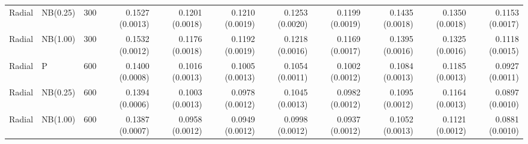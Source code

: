 \begin{table}[p]
{\begin{tabular}{lllrrrrrrrr}
Radial & NB(0.25) & 300 & 0.1527 (0.0013) & 0.1201 (0.0018) & 0.1210 (0.0019) & 0.1253 (0.0020) & 0.1199 (0.0019) & 0.1435 (0.0018) & 0.1350 (0.0018) & 0.1153 (0.0017) \\
Radial & NB(1.00) & 300 & 0.1532 (0.0012) & 0.1176 (0.0018) & 0.1192 (0.0019) & 0.1218 (0.0016) & 0.1169 (0.0017) & 0.1395 (0.0016) & 0.1325 (0.0016) & 0.1118 (0.0015) \\
Radial & P & 600 & 0.1400 (0.0008) & 0.1016 (0.0013) & 0.1005 (0.0013) & 0.1054 (0.0011) & 0.1002 (0.0012) & 0.1084 (0.0013) & 0.1185 (0.0013) & 0.0927 (0.0011) \\
Radial & NB(0.25) & 600 & 0.1394 (0.0006) & 0.1003 (0.0013) & 0.0978 (0.0012) & 0.1045 (0.0013) & 0.0982 (0.0012) & 0.1095 (0.0012) & 0.1164 (0.0013) & 0.0897 (0.0010) \\
Radial & NB(1.00) & 600 & 0.1387 (0.0007) & 0.0958 (0.0012) & 0.0949 (0.0012) & 0.0998 (0.0012) & 0.0937 (0.0012) & 0.1052 (0.0013) & 0.1121 (0.0012) & 0.0881 (0.0010) \\
\hline
\end{tabular}%
}
\end{table}
